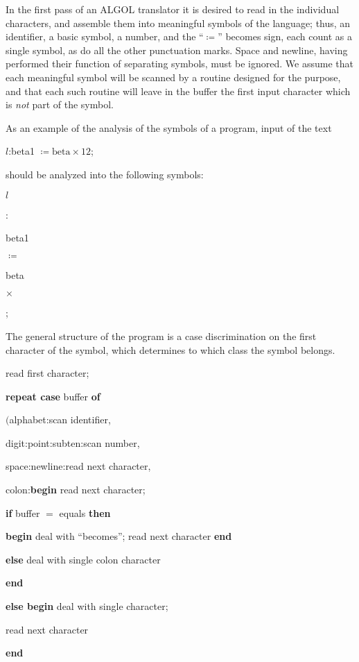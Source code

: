 In the first pass of an ALGOL translator it is desired to read in the individual characters, and assemble them into meaningful symbols of the language; thus, an identifier, a basic symbol, a number, and the ``$\coloneq$'' becomes sign, each count as a single symbol, as do all the other punctuation marks. Space and newline, having performed their function of separating symbols, must be ignored. We assume that each meaningful symbol will be scanned by a routine designed for the purpose, and that each such routine will leave in the buffer the first input character which is \textit{not} part of the symbol.

As an example of the analysis of the symbols of a program, input of the text

\quad $l$:beta1 $\coloneq \text{beta} \times 12$;

\noindent
should be analyzed into the following symbols:

\quad $l$

\quad :

\quad beta1

\quad $\coloneq$

\quad beta

\quad $\times$


\quad ;

The general structure of the program is a case discrimination on the first character of the symbol, which determines to which class the symbol belongs.

read first character;

\textbf{repeat case} buffer \textbf{of}

\quad $($alphabet:scan identifier,

\quad digit:point:subten:scan number,

\quad space:newline:read next character,

\quad colon:\textbf{begin} read next character;

\quad\quad \textbf{if} buffer $=$ equals \textbf{then}

\quad\quad\quad \textbf{begin} deal with ``becomes''; read next character \textbf{end}

\quad\quad \textbf{else} deal with single colon character

\quad\quad \textbf{end}

\quad \textbf{else begin} deal with single character;

\quad\quad read next character

\quad \textbf{end}

